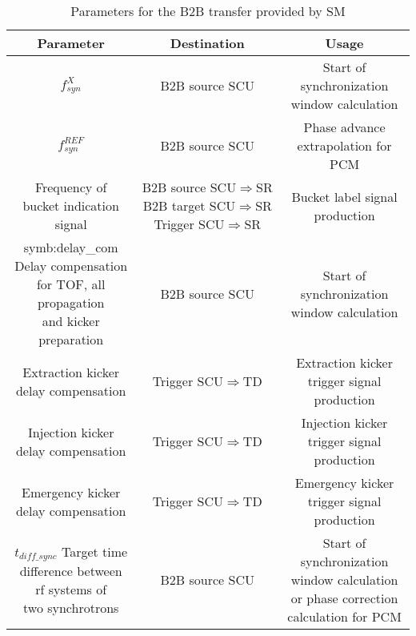 \label{parameter_SM}
\begin{landscape} 
\begin{table}[!htb]

\caption{Parameters for the B2B transfer provided by SM}
\label{requirement}
\begin{center}
    \begin{tabular}{ | c | c | c |}
    \hline
\rowcolor[gray]{0.5}
     	Parameter &Destination & Usage  \\ \hline
$f_{\mathit{syn}}^X $							&	B2B source SCU	&	Start of synchronization window calculation\\ \hline
$f_{\mathit{syn}}^\mathit{REF} 	$			&	B2B source SCU	&	Phase advance extrapolation for PCM	\\ \hline
\tabincell{c}{Frequency of\\ bucket indication signal} 			&	\tabincell{c}{B2B source SCU$\Rightarrow$SR\\B2B target SCU$\Rightarrow$SR\\Trigger SCU$\Rightarrow$SR}& Bucket label signal production\\ \hline
\tabincell{c}{\gls{symb:delay_com} Delay compensation\\ for TOF, all propagation\\ and kicker preparation}	&	B2B source SCU	& Start of synchronization window calculation\\ \hline
\tabincell{c}{Extraction kicker \\delay compensation}&		Trigger SCU$\Rightarrow$TD			&Extraction kicker trigger signal production	\\ \hline
\tabincell{c}{Injection kicker \\delay compensation} &		Trigger SCU$\Rightarrow$TD			&Injection kicker trigger signal production\\ \hline
\tabincell{c}{Emergency kicker \\delay compensation} &		Trigger SCU$\Rightarrow$TD			&Emergency kicker trigger signal production\\ \hline
$t_{\mathit{diff\_sync}}$ \tabincell{c}{Target time \\difference between\\ rf systems of\\ two synchrotrons}							&		B2B source SCU	&\tabincell{c}{Start of synchronization window calculation \\ or phase correction calculation for PCM} \\ \hline

\end{tabular}
\end{center}
\end{table}
\end{landscape}

